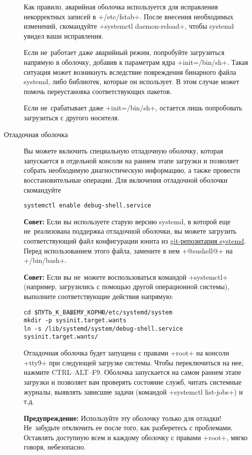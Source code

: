 \documentclass[10pt,oneside,a4paper]{article}
\begin{document}
\begin{description}
	Как правило, аварийная оболочка используется для исправления
	некорректных записей в +/etc/fstab+. После внесения необходимых
	изменений, скомандуйте +systemctl daemon-reload+, чтобы systemd увидел
	ваши исправления.

	Если не~работает даже аварийный режим, попробуйте загрузиться напрямую в
	оболочку, добавив к параметрам ядра +init=/bin/sh+. Такая ситуация может
	возникнуть вследствие повреждения бинарного файла systemd, либо
	библиотек, которые он использует. В этом случае может помочь
	переустановка соответствующих пакетов.

	Если не~срабатывает даже +init=/bin/sh+, остается лишь попробовать
	загрузиться с другого носителя.

\item[Отладочная оболочка]\hypertarget{it:dbgshell}{}
	Вы можете включить специальную отладочную оболочку, которая запускается
	в отдельной консоли на раннем этапе загрузки и позволяет собрать
	необходимую диагностическую информацию, а также провести
	восстановительные операции. Для включения отладочной оболочки
	скомандуйте
\begin{Verbatim}
systemctl enable debug-shell.service
\end{Verbatim}
	
	\textbf{Совет:} Если вы используете старую версию systemd, в которой еще
	не~реализована поддержка отладочной оболочки, вы можете загрузить
	соответствующий файл конфигурации юнита из
	\href{http://cgit.freedesktop.org/systemd/systemd/plain/units/debug-shell.service.in}{git-репозитария
	systemd}. Перед использованием этого файла, замените в нем +@sushell@+
	на +/bin/bash+.

	\textbf{Совет:} Если вы не~можете воспользоваться командой +systemctl+
	(например, загрузились с помощью другой операционной системы),
	выполните соответствующие действия напрямую:
\begin{Verbatim}
cd $ПУТЬ_К_ВАШЕМУ_КОРНЮ/etc/systemd/system
mkdir -p sysinit.target.wants
ln -s /lib/systemd/system/debug-shell.service sysinit.target.wants/
\end{Verbatim}
	
	Отладочная оболочка будет запущена с правами +root+ на консоли +tty9+
	при следующей загрузке системы. Чтобы переключиться на нее, нажмите
	CTRL--ALT--F9. Оболочка запускается на самом раннем этапе загрузки и
	позволяет вам проверять состояние служб, читать системные журналы,
	выявлять зависшие задачи (командой +systemctl list-jobs+) и т.д.

	\textbf{Предупреждение:} Используйте эту оболочку только для отладки!
	Не~забудьте отключить ее после того, как разберетесь с проблемами.
	Оставлять доступную всем и каждому оболочку с правами +root+, мягко
	говоря, небезопасно.


\end{description}
\end{document}
